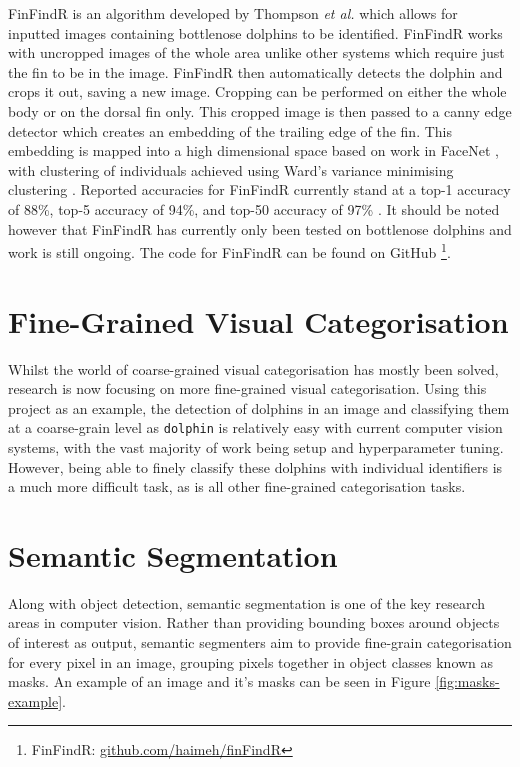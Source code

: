 FinFindR is an algorithm developed by Thompson \textit{et al. } which allows for inputted images containing bottlenose dolphins to be identified. FinFindR works with uncropped images of the whole area unlike other systems which require just the fin to be in the image. FinFindR then automatically detects the dolphin and crops it out, saving a new image. Cropping can be performed on either the whole body or on the dorsal fin only. This cropped image is then passed to a canny edge detector which creates an embedding of the trailing edge of the fin. This embedding is mapped into a high dimensional space based on work in FaceNet \cite{schroff_facenet_2015}, with clustering of individuals achieved using Ward's variance minimising clustering \cite{ward_hierarchical_1963}. Reported accuracies for FinFindR currently stand at a top-1 accuracy of 88\%, top-5 accuracy of 94\%, and top-50 accuracy of 97\% \cite{thompson_finfindrpdf_2019}. It should be noted however that FinFindR has currently only been tested on bottlenose dolphins and work is still ongoing. The code for FinFindR can be found on GitHub \footnote{FinFindR: \href{https://github.com/haimeh/finFindR}{github.com/haimeh/finFindR}}.

\section{Fine-Grained Visual Categorisation}\label{ch:Background,sec:Fine-grainedCV}

Whilst the world of coarse-grained visual categorisation has mostly been solved, research is now focusing on more fine-grained visual categorisation. Using this project as an example, the detection of dolphins in an image and classifying them at a coarse-grain level as \texttt{dolphin} is relatively easy with current computer vision systems, with the vast majority of work being setup and hyperparameter tuning. However, being able to finely classify these dolphins with individual identifiers is a much more difficult task, as is all other fine-grained categorisation tasks. 

\section{Semantic Segmentation}\label{ch:Background,sec:semanticSegmentation}
Along with object detection, semantic segmentation is one of the key research areas in computer vision. Rather than providing bounding boxes around objects of interest as output, semantic segmenters aim to provide fine-grain categorisation for every pixel in an image, grouping pixels together in object classes known as masks. An example of an image and it's masks can be seen in Figure \ref{fig:masks-example}.

